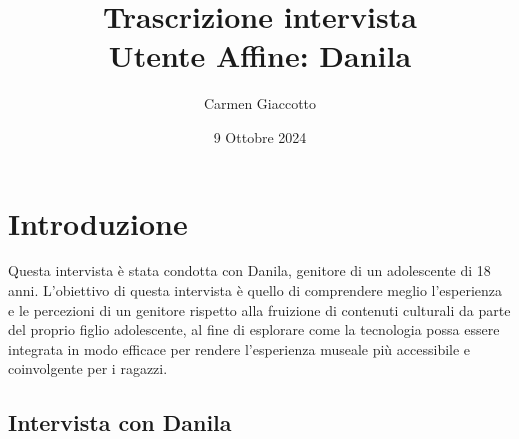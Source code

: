 \documentclass{article}
\title{\textbf{Trascrizione intervista}\\ Utente Affine: Danila}
\author{Carmen Giaccotto }
\date{9 Ottobre 2024}
\begin{document}
\maketitle

\section{Introduzione}
Questa intervista è stata condotta con Danila, genitore di un adolescente di 18 anni.
L'obiettivo di questa intervista è quello di comprendere meglio l'esperienza e le percezioni di un genitore rispetto alla fruizione di contenuti culturali da parte del proprio figlio adolescente, al fine di esplorare come la tecnologia possa essere integrata in modo efficace per rendere l’esperienza museale più accessibile e coinvolgente per i ragazzi.

\subsection{\textcolor{subsectioncolor}{Intervista con Danila}}
\end{document}
